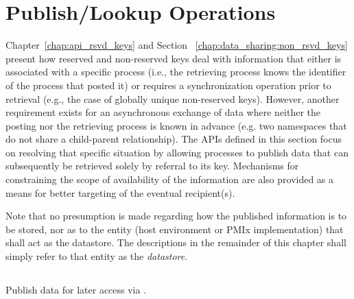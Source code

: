 \chapter{Publish/Lookup Operations}
\label{chap:pub}

Chapter~\ref{chap:api_rsvd_keys}
and
Section ~\ref{chap:data_sharing:non_rsvd_keys}
present how reserved and non-reserved keys deal with
information that either is associated with a specific process (i.e., the
retrieving process knows the identifier of the process that posted it) or
requires a synchronization operation prior to retrieval (e.g., the case of
globally unique non-reserved keys). However, another requirement exists for an
asynchronous exchange of data where neither the posting nor the retrieving
process is known in advance (e.g. two namespaces that do not share a child-parent relationship).
The \acp{API} defined in this section focus on resolving that specific
situation by allowing processes to publish data that can subsequently be
retrieved solely by referral to its key. Mechanisms for constraining
the scope of availability of the information are also provided as a means for better
targeting of the eventual recipient(s).

Note that no presumption is made regarding how the published information is to be stored, nor as to the entity (host environment or \ac{PMIx} implementation) that shall act as the datastore. The descriptions in the remainder of this chapter shall simply refer to that entity as the \emph{datastore}.


\section{}

\summary

Publish data for later access via .

\format


\begin{arglist}
\end{arglist}


